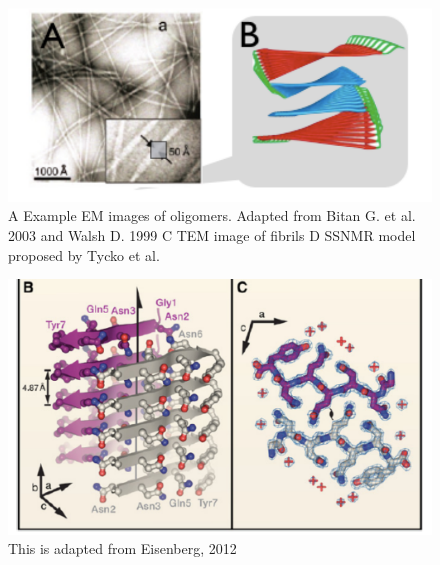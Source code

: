 
\begin{figure}
  \centering
  \includegraphics[width=6in]{figures/introduction/fibril_TEM_SSNMR.pdf}
  \caption[Characteristic cross-$\beta$ spacings from X-ray fibre diffraction studies of amyloid fibrils]{A Example EM images of oligomers.  Adapted from Bitan G. et al. 2003 and Walsh D. 1999 C TEM image of fibrils D SSNMR model proposed by Tycko et al.}
  \label{fig:fibril_TEM_SSNMR}
\end{figure}

\begin{figure}
  \centering
  \includegraphics[width=6in]{figures/introduction/fibril_xray_model.pdf}
  \caption[Characteristic cross-$\beta$ spacings from X-ray fibre diffraction studies of amyloid fibrils]{This is adapted from Eisenberg, 2012}
  \label{fig:fibril_xray_model}
\end{figure}

